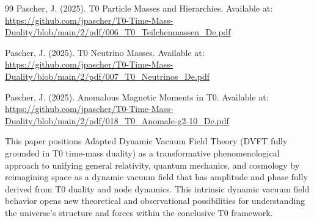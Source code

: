 \documentclass[12pt,a4paper]{article}
\begin{document}
\begin{thebibliography}{99}
		Pascher, J. (2025). T0 Particle Masses and Hierarchies. Available at: \url{https://github.com/jpascher/T0-Time-Mass-Duality/blob/main/2/pdf/006_T0_Teilchenmassen_De.pdf}
		
		Pascher, J. (2025). T0 Neutrino Masses. Available at: \url{https://github.com/jpascher/T0-Time-Mass-Duality/blob/main/2/pdf/007_T0_Neutrinos_De.pdf}
		
		Pascher, J. (2025). Anomalous Magnetic Moments in T0. Available at: \url{https://github.com/jpascher/T0-Time-Mass-Duality/blob/main/2/pdf/018_T0_Anomale-g2-10_De.pdf}
		
		This paper positions Adapted Dynamic Vacuum Field Theory (DVFT fully grounded in T0 time-mass duality) as a transformative phenomenological approach to unifying general relativity, quantum mechanics, and cosmology by reimagining space as a dynamic vacuum field that has amplitude and phase fully derived from T0 duality and node dynamics. This intrinsic dynamic vacuum field behavior opens new theoretical and observational possibilities for understanding the universe’s structure and forces within the conclusive T0 framework.
	\end{thebibliography}
	
\end{document}
